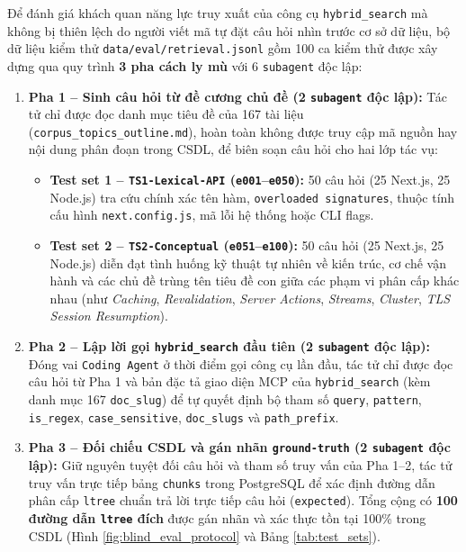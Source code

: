 Để đánh giá khách quan năng lực truy xuất của công cụ \texttt{hybrid\_\allowbreak search} mà không bị thiên lệch do người viết mã tự đặt câu hỏi nhìn trước cơ sở dữ liệu, bộ dữ liệu kiểm thử \nolinkurl{data/eval/retrieval.jsonl} gồm 100 ca kiểm thử được xây dựng qua quy trình \textbf{3 pha cách ly mù} với 6 \texttt{subagent} độc lập:
\begin{enumerate}
    \item \textbf{Pha 1 -- Sinh câu hỏi từ đề cương chủ đề (2 \texttt{subagent} độc lập):} Tác tử chỉ được đọc danh mục tiêu đề của 167 tài liệu (\texttt{corpus\_topics\_outline.md}), hoàn toàn không được truy cập mã nguồn hay nội dung phân đoạn trong CSDL, để biên soạn câu hỏi cho hai lớp tác vụ:
    \begin{itemize}
        \item \textbf{Test set 1 -- \texttt{TS1-Lexical-API} (\texttt{e001}--\texttt{e050}):} 50 câu hỏi (25 Next.js, 25 Node.js) tra cứu chính xác tên hàm, \texttt{overloaded signatures}, thuộc tính cấu hình \nolinkurl{next.config.js}, mã lỗi hệ thống hoặc CLI flags.
        \item \textbf{Test set 2 -- \texttt{TS2-Conceptual} (\texttt{e051}--\texttt{e100}):} 50 câu hỏi (25 Next.js, 25 Node.js) diễn đạt tình huống kỹ thuật tự nhiên về kiến trúc, cơ chế vận hành và các chủ đề trùng tên tiêu đề con giữa các phạm vi phân cấp khác nhau (như \textit{Caching}, \textit{Revalidation}, \textit{Server Actions}, \textit{Streams}, \textit{Cluster}, \textit{TLS Session Resumption}).
    \end{itemize}
    \item \textbf{Pha 2 -- Lập lời gọi \texttt{hybrid\_search} đầu tiên (2 \texttt{subagent} độc lập):} Đóng vai \texttt{Coding Agent} ở thời điểm gọi công cụ lần đầu, tác tử chỉ được đọc câu hỏi từ Pha 1 và bản đặc tả giao diện MCP của \texttt{hybrid\_search} (kèm danh mục 167 \texttt{doc\_slug}) để tự quyết định bộ tham số \texttt{query}, \texttt{pattern}, \texttt{is\_regex}, \texttt{case\_sensitive}, \texttt{doc\_slugs} và \texttt{path\_prefix}.
    \item \textbf{Pha 3 -- Đối chiếu CSDL và gán nhãn \texttt{ground-truth} (2 \texttt{subagent} độc lập):} Giữ nguyên tuyệt đối câu hỏi và tham số truy vấn của Pha 1--2, tác tử truy vấn trực tiếp bảng \texttt{chunks} trong PostgreSQL để xác định đường dẫn phân cấp \texttt{ltree} chuẩn trả lời trực tiếp câu hỏi (\texttt{expected}). Tổng cộng có \textbf{100 đường dẫn \texttt{ltree} đích} được gán nhãn và xác thực tồn tại 100\% trong CSDL (Hình \ref{fig:blind_eval_protocol} và Bảng \ref{tab:test_sets}).
\end{enumerate}

